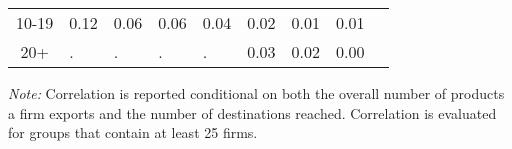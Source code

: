 \documentclass{article}
\begin{document}
\begin{table}[h]
{\begin{threeparttable}
\begin{tabular}{cllllllll}
10-19                                      & 0.12     & 0.06    & 0.06 & 0.04 & 0.02 & 0.01  & 0.01 \\
20+                                            & .     & .    & . & . & 0.03 & 0.02  & 0.00 \\
\hline\hline
\end{tabular}
\begin{tablenotes}
\small
\item  \noindent  \footnotesize{\emph{Note:} Correlation is reported conditional on both the overall number of products a firm exports and the number of destinations reached. Correlation is evaluated for groups that contain at least 25 firms. }
\end{tablenotes}
\end{threeparttable}
}
\end{table}
\end{document}
